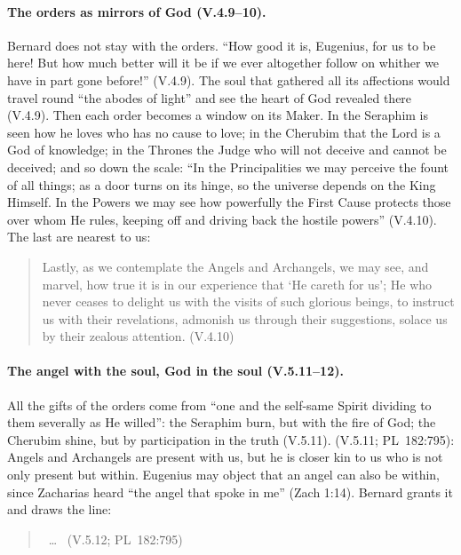 \paragraph{The orders as mirrors of God (V.4.9--10).} Bernard does not stay
with the orders. ``How good it is, Eugenius, for us to be here! But how much
better will it be if we ever altogether follow on whither we have in part
gone before!'' (V.4.9). The soul that gathered all its affections would
travel round ``the abodes of light'' and see the heart of God revealed there
(V.4.9). Then each order becomes a window on its Maker. In the Seraphim is
seen how he loves who has no cause to love; in the Cherubim that the Lord is
a God of knowledge; in the Thrones the Judge who will not deceive and cannot
be deceived; and so down the scale: ``In the Principalities we may perceive
the fount of all things; as a door turns on its hinge, so the universe
depends on the King Himself. In the Powers we may see how powerfully the
First Cause protects those over whom He rules, keeping off and driving back
the hostile powers'' (V.4.10). The last are nearest to us:

\begin{quote}
Lastly, as we contemplate the Angels and Archangels, we may see, and
marvel, how true it is in our experience that `He careth for us'; He who
never ceases to delight us with the visits of such glorious beings, to
instruct us with their revelations, admonish us through their suggestions,
solace us by their zealous attention. (V.4.10)
\end{quote}

\paragraph{The angel with the soul, God in the soul (V.5.11--12).} All the
gifts of the orders come from ``one and the self-same Spirit dividing to
them severally as He willed'': the Seraphim burn, but with the fire of God;
the Cherubim shine, but by participation in the truth (V.5.11).  (V.5.11; PL~182:795): Angels and Archangels are present with us, but
he is closer kin to us who is not only present but within. Eugenius may
object that an angel can also be within, since Zacharias heard ``the angel
that spoke in me'' (Zach 1:14). Bernard grants it and draws the line:

\begin{quote}
~\dots\  (V.5.12; PL~182:795)
\end{quote}

